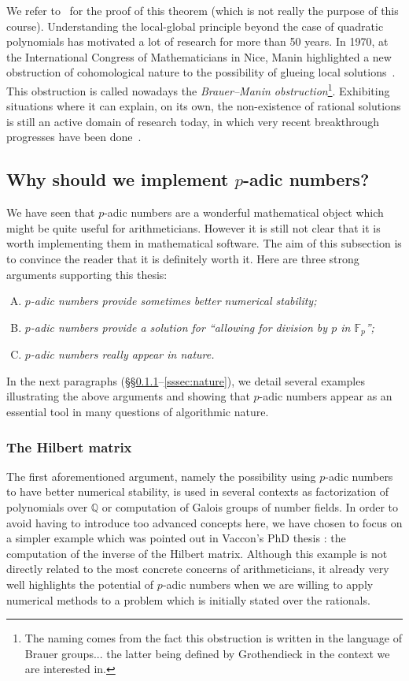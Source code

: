 \documentclass[11pt]{article}
\numberwithin{equation}{section}
\numberwithin{figure}{section}
\theoremstyle{definition}
\newcommand{\Q}{\mathbb Q}
\newcommand{\F}{\mathbb F}
\newcommand{\Fp}{\F_p}
\begin{document}
We refer to~\cite{Se70} for the proof of this theorem (which is not
really the purpose of this course).
Understanding the local-global principle beyond the case of quadratic 
polynomials has motivated a lot of research for more than 50 years.
In 1970, at the International Congress of Mathematicians in Nice, Manin 
highlighted a new obstruction of cohomological nature to the possibility of glueing local 
solutions~\cite{Ma71}. This obstruction is called nowadays the 
\emph{Brauer--Manin obstruction}\footnote{The naming comes from the fact 
this obstruction is written in the language of Brauer groups... the 
latter being defined by Grothendieck in the context we are interested 
in.}. Exhibiting situations where it can explain, on its own, the 
non-existence of rational solutions is still an active domain of 
research today, in which very recent breakthrough progresses have been 
done~\cite{HaWi16,Ha16}.

\subsection{Why should we implement $p$-adic numbers?}

We have seen that $p$-adic numbers are a wonderful mathematical object 
which might be quite useful for arithmeticians. However it is still not 
clear that it is worth implementing them in mathematical software.
The aim of this subsection is to convince the reader that it is
definitely worth it. Here are three strong arguments supporting this 
thesis:
\begin{enumerate}[(A)]
\renewcommand{\itemsep}{0pt}
\item \emph{$p$-adic numbers provide sometimes better numerical stability;}
\item \emph{$p$-adic numbers provide a solution for ``allowing for
division by $p$ in $\Fp$'';}
\item \emph{$p$-adic numbers really appear in nature.}
\end{enumerate}
In the next paragraphs (\S\S \ref{sssec:Hilbert}--\ref{sssec:nature}), 
we detail several examples illustrating the above arguments and showing 
that $p$-adic numbers appear as an essential tool in many questions 
of algorithmic nature.

\subsubsection{The Hilbert matrix}
\label{sssec:Hilbert}

The first aforementioned argument, namely the possibility using $p$-adic 
numbers to have better numerical stability, is used in several contexts 
as factorization of polynomials over $\Q$ or computation of Galois 
groups of number fields.
In order to avoid having to introduce too advanced concepts here, we 
have chosen to focus on a simpler example which was pointed out in 
Vaccon's PhD thesis \cite[\S 1.3.4]{Va15}: the computation of 
the inverse of the Hilbert matrix. Although this example is not directly 
related to the most concrete concerns of arithmeticians, it already very 
well highlights the potential of $p$-adic numbers when we are willing
to apply numerical methods to a problem which is initially stated over 
the rationals.
\end{document}
